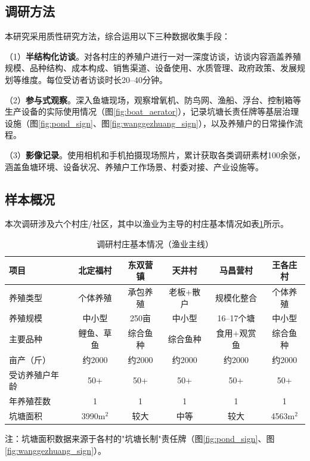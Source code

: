 \documentclass[12pt,a4paper]{article}
\begin{document}
\subsection{调研方法}

本研究采用质性研究方法，综合运用以下三种数据收集手段：

（1）\textbf{半结构化访谈}。对各村庄的养殖户进行一对一深度访谈，访谈内容涵盖养殖规模、品种结构、成本构成、销售渠道、设备使用、水质管理、政府政策、发展规划等维度。每位受访者访谈时长20--40分钟。

（2）\textbf{参与式观察}。深入鱼塘现场，观察增氧机、防鸟网、渔船、浮台、控制箱等生产设备的实际使用情况（图\ref{fig:boat_aerator}），记录坑塘长责任牌等基层治理设施（图\ref{fig:pond_sign}、图\ref{fig:wanggezhuang_sign}），以及养殖户的日常操作流程。

（3）\textbf{影像记录}。使用相机和手机拍摄现场照片，累计获取各类调研素材100余张，涵盖鱼塘环境、设备状况、养殖户工作场景、村委对接、产业设施等。

\subsection{样本概况}

本次调研涉及六个村庄/社区，其中以渔业为主导的村庄基本情况如表\ref{tab:villages}所示。

\begin{table}[H]
\centering
\caption{调研村庄基本情况（渔业主线）}
\label{tab:villages}
\begin{tabular}{lccccc}
\toprule
\textbf{项目} & \textbf{北定福村} & \textbf{东双营镇} & \textbf{天井村} & \textbf{马昌营村} & \textbf{王各庄村} \\
\midrule
养殖类型 & 个体养殖 & 承包养殖 & 老板+散户 & 规模化整合 & 个体养殖 \\
养殖规模 & 中小型 & 250亩 & 中小型 & 16--17个塘 & 中小型 \\
主要品种 & 鲤鱼、草鱼 & 综合鱼种 & 综合鱼种 & 食用+观赏鱼 & 综合鱼种 \\
亩产（斤） & 约2000 & 约2000 & 约2000 & 约2000 & 约2000 \\
受访养殖户年龄 & 50+ & 50+ & 50+ & 50+ & 50+ \\
年养殖茬数 & 1 & 1 & 1 & 1 & 1 \\
坑塘面积 & 3990m$^2$ & 较大 & 中等 & 较大 & 4563m$^2$ \\
\bottomrule
\end{tabular}
\end{table}

注：坑塘面积数据来源于各村的"坑塘长制"责任牌（图\ref{fig:pond_sign}、图\ref{fig:wanggezhuang_sign}）。
\end{document}

